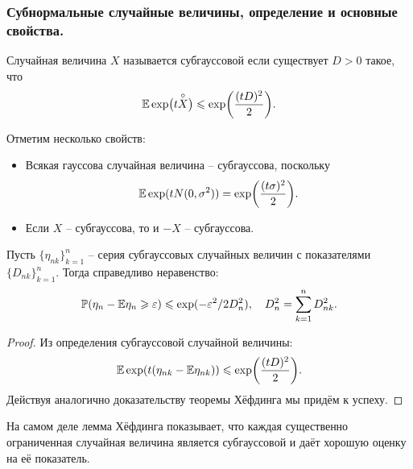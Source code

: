 \subsubsection{Субнормальные случайные величины, определение и основные свойства.}
\begin{definition}
    Случайная величина  $X$ называется субгауссовой если существует $D > 0$ такое, что 
    \[
        \mathbb{E} \exp\bigr({t\overset{\circ}{X}}\bigr) \leqslant \exp\biggr({\frac{(tD)^2}{2}}\biggr).
    \]
\end{definition}
\begin{note}
    Отметим несколько свойств:
    \begin{itemize}
        \item Всякая гауссова случайная величина -- субгауссова, поскольку 
        \[
            \mathbb{E} \exp({tN(0, \sigma^2)}) = \exp\biggr({\frac{(t\sigma)^2}{2}}\biggr).
        \]
        \item Если $X$ -- субгауссова, то и $-X$ -- субгауссова.
    \end{itemize}
\end{note}
\begin{lemma}
    Пусть $\{\eta_{nk}\}_{k = 1}^n$ -- серия субгауссовых случайных величин с показателями $\{D_{nk}\}_{k = 1}^n$. Тогда справедливо неравенство:
    \[
        \mathbb{P}(\eta_n - \mathbb{E}\eta_n \geqslant \varepsilon) \leqslant \exp({-\varepsilon^2/2D_n^2}), \quad D_n^2 = \sum\limits_{k = 1}^n D_{nk}^2.
    \] 
\end{lemma}
\begin{proof}
    Из определения субгауссовой случайной величины:
    \[
        \mathbb{E} \exp({t(\eta_{nk} - \mathbb{E} \eta_{nk})}) \leqslant \exp\biggr({\frac{(tD)^2}{2}}\biggr).
    \]
    Действуя аналогично доказательству теоремы Хёфдинга мы придём к успеху.
\end{proof}
\begin{note}
    На самом деле лемма Хёфдинга показывает, что каждая существенно ограниченная случайная величина является субгауссовой и даёт хорошую оценку на её показатель.
\end{note}

